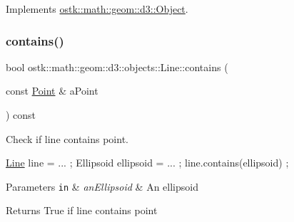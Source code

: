 Implements \hyperlink{classostk_1_1math_1_1geom_1_1d3_1_1_object_a676013f9555f6492687f9809b2db887b}{ostk\+::math\+::geom\+::d3\+::\+Object}.

\mbox{\label{classostk_1_1math_1_1geom_1_1d3_1_1objects_1_1_line_a51121a95b14948a800a36f57aa85e55a}} 
\subsubsection{\texorpdfstring{contains()}{contains()}}
{\footnotesize\ttfamily bool ostk\+::math\+::geom\+::d3\+::objects\+::\+Line\+::contains (\begin{DoxyParamCaption}\item[{const \hyperlink{classostk_1_1math_1_1geom_1_1d3_1_1objects_1_1_point}{Point} \&}]{a\+Point }\end{DoxyParamCaption}) const}



Check if line contains point. 


\begin{DoxyCode}
\hyperlink{classostk_1_1math_1_1geom_1_1d3_1_1objects_1_1_line_a9ebdaaf67a4bd91780808f8683463ebe}{Line} line = ... ;
Ellipsoid ellipsoid = ... ;
line.contains(ellipsoid) ;
\end{DoxyCode}



\begin{DoxyParams}[1]{Parameters}
\mbox{\tt in}  & {\em an\+Ellipsoid} & An ellipsoid \\
\hline
\end{DoxyParams}
\begin{DoxyReturn}{Returns}
True if line contains point 
\end{DoxyReturn}
\mbox{\label{classostk_1_1math_1_1geom_1_1d3_1_1objects_1_1_line_a7f312d93308a5f0a876d69c46662838b}} 

